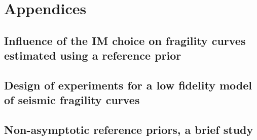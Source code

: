 \documentclass[a4paper]{book}
\begin{document}



\appendix
\part*{Appendices}\label{part:appendix}


\chapter{Influence of the IM choice on fragility curves estimated using a reference prior}\label{app:chap:uncecomp}



\chapter{Design of experiments for a low fidelity model of seismic fragility curves}\label{app:chap:ESAIM}




\chapter{Non-asymptotic reference priors, a brief study}\label{app:chap:nonasympt}





 
 

\printbibliography[heading=chapter,title=Bibliography]
\end{document}
